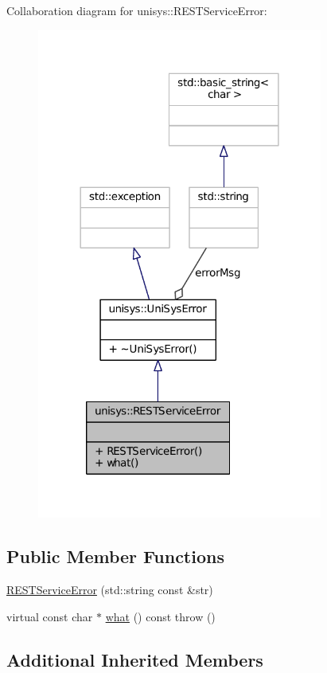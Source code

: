 Collaboration diagram for unisys\-:\-:R\-E\-S\-T\-Service\-Error\-:
\nopagebreak
\begin{figure}[H]
\begin{center}
\leavevmode
\includegraphics[width=266pt]{classunisys_1_1RESTServiceError__coll__graph}
\end{center}
\end{figure}
\subsection*{Public Member Functions}
\begin{DoxyCompactItemize}
\item 
\hyperlink{classunisys_1_1RESTServiceError_a4b93607473a1993db263dd315358dc06}{R\-E\-S\-T\-Service\-Error} (std\-::string const \&str)
\item 
virtual const char $\ast$ \hyperlink{classunisys_1_1RESTServiceError_a2266f75407ef62a52db4595ab2c8599c}{what} () const   throw ()
\end{DoxyCompactItemize}
\subsection*{Additional Inherited Members}


